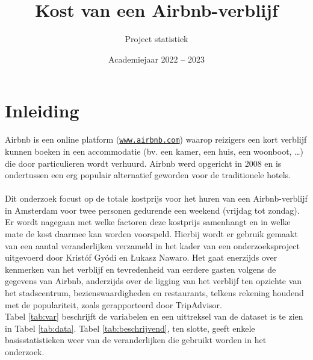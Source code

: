 \documentclass[a4paper]{kulakarticle}
\title{Kost van een Airbnb-verblijf}
\author{Project statistiek}
\date{Academiejaar 2022 -- 2023}
\begin{document}
	\maketitle
	
	\section*{Inleiding}
	Airbnb is een online platform (\href{https://www.airbnb.com}{\texttt{www.airbnb.com}}) waarop reizigers een kort verblijf kunnen boeken in een accommodatie (bv. een kamer, een huis, een woonboot, …) die door particulieren wordt verhuurd. Airbnb werd opgericht in 2008 en is ondertussen een erg populair alternatief geworden voor de traditionele hotels. \\
	\\
	Dit onderzoek focust op de totale kostprijs voor het huren van een Airbnb-verblijf in Amsterdam voor twee personen gedurende een weekend (vrijdag tot zondag). Er wordt nagegaan met welke factoren deze kostprijs samenhangt en in welke mate de kost daarmee kan worden voorspeld. Hierbij wordt er gebruik gemaakt van een aantal veranderlijken verzameld in het kader van een onderzoeksproject uitgevoerd door Kristóf Gyódi en Łukasz Nawaro. Het gaat enerzijds over kenmerken van het verblijf en tevredenheid van eerdere gasten volgens de gegevens van Airbnb, anderzijds over de ligging van het verblijf ten opzichte van het stadscentrum, bezienswaardigheden en restaurants, telkens rekening houdend met de populariteit, zoals gerapporteerd door TripAdvisor.    \\
	Tabel \ref{tab:var} beschrijft de variabelen en een uittreksel van de dataset is te zien in Tabel \ref{tab:data}. Tabel \ref{tab:beschrijvend}, ten slotte, geeft enkele basisstatistieken weer van de veranderlijken die gebruikt worden in het onderzoek. 
	
\end{document}
